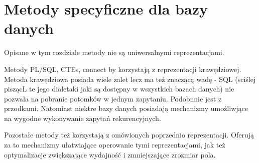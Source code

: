 \chapter{Metody specyficzne dla bazy danych}
    Opisane w tym rozdziale metody nie są uniwersalnymi reprezentacjami.


Metody PL/SQL, CTEs, connect by korzystają z reprezentacji krawędziowej.
Metoda krawędziowa posiada wiele zalet lecz ma też znaczącą wadę - 
SQL (sciślej piszącL te jego dialetaki jaki są dostępny w wszystkich bazach danych)
nie pozwala na pobranie potomków w jednym zapytaniu. 
Podobnnie jest z przodkami. 
Natomiast niektre bazy danych posiadają mechanizmy umożliwjące na wygodne wykonywanie zapytań rekurencyjnych.


Pozostałe metody też korzystają z omówionych poprzednio reprezentacji.
Oferują za to mechanizmy ułatwiające operowanie tymi reprezentacjami, 
jak też optymalizacje zwiększające wydajność i zmniejszające zrozmiar pola.